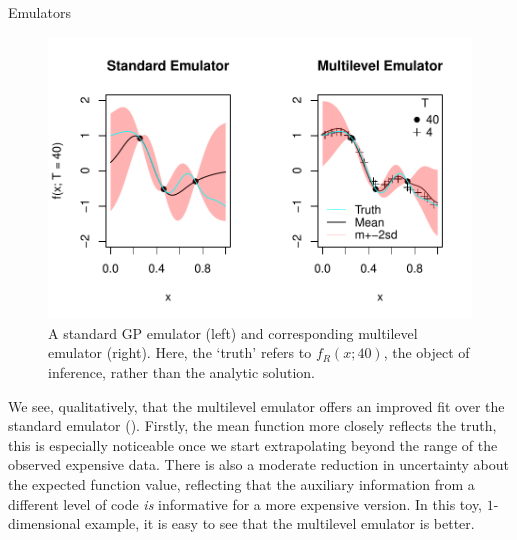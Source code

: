\begin{chapter}{Emulators \label{Ch:Emulators}}
\begin{figure}[h]
  \centering
  \includegraphics{fig-emulators/compare-ml.pdf}
  \caption{A standard GP emulator (left) and corresponding multilevel emulator (right). Here, the `truth' refers to $f_R(x;40)$, the object of inference, rather than the analytic solution.}
  \label{Fig:compare-ml}
\end{figure}
We see, qualitatively, that the multilevel emulator offers an improved fit over the standard emulator (). Firstly, the mean function more closely reflects the truth, this is especially noticeable once we start extrapolating beyond the range of the observed expensive data. There is also a moderate reduction in uncertainty about the expected function value, reflecting that the auxiliary information from a different level of code \textit{is} informative for a more expensive version. In this toy, $1$-dimensional example, it is easy to see that the multilevel emulator is better.

\end{chapter}
